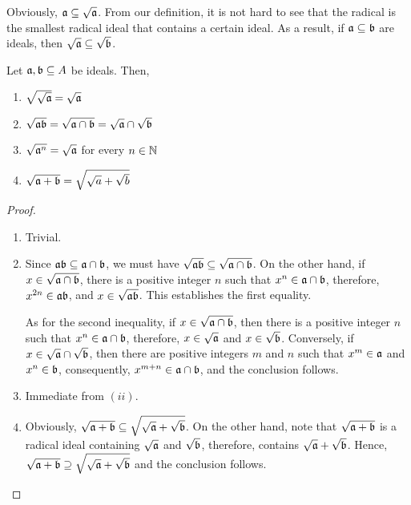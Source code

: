 Obviously, $\mathfrak a\subseteq\sqrt{\mathfrak a}$. From our definition, it is not hard to see that the radical is the smallest radical ideal that contains a certain ideal. As a result, if $\mathfrak a\subseteq\mathfrak b$ are ideals, then $\sqrt{\mathfrak a}\subseteq\sqrt{\mathfrak b}$.

\begin{proposition}
    Let $\mathfrak a,\mathfrak b\subseteq A$ be ideals. Then, 
    \begin{enumerate}[label=(\roman*)]
        \item $\sqrt{\sqrt{\mathfrak a}} = \sqrt{\mathfrak a}$
        \item $\sqrt{\mathfrak a\mathfrak b} = \sqrt{\mathfrak a\cap\mathfrak b} = \sqrt{\mathfrak a}\cap\sqrt{\mathfrak b}$
        \item $\sqrt{\mathfrak a^n} = \sqrt{\mathfrak a}$ for every $n\in\mathbb{N}$
        \item $\sqrt{\mathfrak a + \mathfrak b} = \sqrt{\sqrt{a} + \sqrt{b}}$
    \end{enumerate}
\end{proposition}
\begin{proof}
\begin{enumerate}[label=(\roman*)]
    \item Trivial.
    \item Since $\mathfrak a\mathfrak b\subseteq\mathfrak a\cap\mathfrak b$, we must have $\sqrt{\mathfrak a\mathfrak b}\subseteq\sqrt{\mathfrak a\cap\mathfrak b}$. On the other hand, if $x\in\sqrt{\mathfrak a\cap\mathfrak b}$, there is a positive integer $n$ such that $x^n\in\mathfrak a\cap\mathfrak b$, therefore, $x^{2n}\in\mathfrak a\mathfrak b$, and $x\in\sqrt{\mathfrak a\mathfrak b}$. This establishes the first equality.

    As for the second inequality, if $x\in\sqrt{\mathfrak a\cap\mathfrak b}$, then there is a positive integer $n$ such that $x^n\in\mathfrak a\cap\mathfrak b$, therefore, $x\in\sqrt{\mathfrak a}$ and $x\in\sqrt{\mathfrak b}$. Conversely, if $x\in\sqrt{\mathfrak a}\cap\sqrt{\mathfrak b}$, then there are positive integers $m$ and $n$ such that $x^m\in\mathfrak a$ and $x^n\in\mathfrak b$, consequently, $x^{m + n}\in\mathfrak a\cap\mathfrak b$, and the conclusion follows. 

    \item Immediate from $(ii)$.
    \item Obviously, $\sqrt{\mathfrak a + \mathfrak b}\subseteq\sqrt{\sqrt{\mathfrak a} + \sqrt{\mathfrak b}}$. On the other hand, note that $\sqrt{\mathfrak a + \mathfrak b}$ is a radical ideal containing $\sqrt{\mathfrak a}$ and $\sqrt{\mathfrak b}$, therefore, contains $\sqrt{\mathfrak a} + \sqrt{\mathfrak b}$. Hence, $\sqrt{\mathfrak a + \mathfrak b}\supseteq\sqrt{\sqrt{\mathfrak a} + \sqrt{\mathfrak b}}$ and the conclusion follows.
\end{enumerate}
\end{proof}

